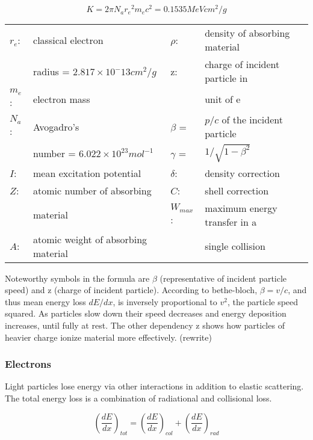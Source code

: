 \begin{equation}
  K = 2\pi N_a {r_{e}}^{2} m_e c^2 = 0.1535 MeVcm^2/g
\end{equation}

\begin{table}[H]
\rmfamily
\centering
\begin{tabular}{llll}
$r_{e}$: & classical electron & $\rho$: & density of absorbing material \\
 & radius = $2.817\times10^-13cm^2/g$ & z: & charge of incident particle in \\
$m_{e}$: & electron mass &  & unit of e \\
$N_{a}$: & Avogadro's & $\beta$ = & $p/c$ of the incident particle \\
 & number = $6.022 \times 10^{23}mol^{-1}$ & $\gamma$ = & $1/\sqrt{1-\beta^2}$ \\
$I$: & mean excitation potential & $\delta$: & density correction \\
$Z$: & atomic number of absorbing & $C$: & shell correction \\
 & material & $W_{max}$: & maximum energy transfer in a \\
$A$: & atomic weight of absorbing material &  & single collision \\

\end{tabular}
\end{table}

Noteworthy symbols in the formula are $\beta$ (representative of incident particle speed) and z (charge of incident particle).
According to bethe-bloch, $\beta = v/c$, and thus mean energy loss $dE/dx$, is inversely proportional to $v^2$, the particle speed squared. As particles slow down their speed decreases and energy deposition increases, until fully at rest. The other dependency z shows how particles of heavier charge ionize material more effectively. (rewrite)
\subsubsection{Electrons}
Light particles lose energy via other interactions in addition to elastic scattering. The total energy loss is a combination of radiational and collisional loss.

    \begin{equation}
      \left(\frac{dE}{dx}\right)_{tot}=\left(\frac{dE}{dx}\right)_{col}+\left(\frac{dE}{dx}\right)_{rad}
    \end{equation}

